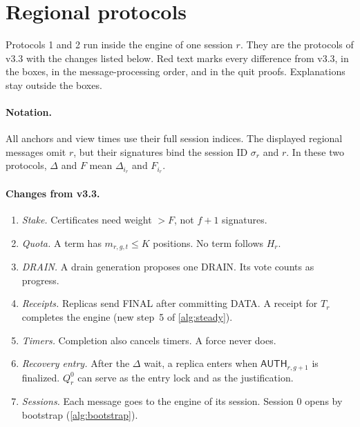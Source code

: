 \documentclass[11pt,a4paper]{article}
\newcommand{\RR}[1]{{\color{rrRed}#1}}
\newif\ifrevmarks
\newcommand{\Rv}[1]{\ifrevmarks\leavevmode{\color{rvBlue}#1}\else#1\fi}
\newcommand{\tagg}[1]{\ensuremath{\mathsf{#1}}}
\newcounter{protocol}
\begin{document}
\section{Regional protocols}
\label{sec:protocols}
Protocols 1 and 2 run inside the engine of one session $r$. They are the
protocols of v3.3 with the changes listed below. \RR{Red text} marks
every difference from v3.3, in the boxes, in the message-processing
order, and in the quit proofs. Explanations stay outside the boxes.

\paragraph{Notation.}
All anchors and view times use their full session indices. The displayed
regional messages omit $r$, but their signatures bind the \Rv{session ID
$\sigma_r$} and $r$. In these two protocols, $\Delta$ and $F$ mean
$\Delta_{i_r}$ and $F_{i_r}$.

\paragraph{Changes from v3.3.}
\begin{enumerate}[label=\arabic*.]
\item \emph{Stake.} Certificates need weight $>F$, not $f+1$ signatures.
\item \emph{Quota.} A term has $m_{r,g,t}\le K$ positions. No term follows
$H_r$.
\item \emph{DRAIN.} A drain generation proposes one DRAIN. Its vote
counts as progress.
\item \emph{Receipts.} Replicas send FINAL after committing DATA. A
receipt for $T_r$ completes the engine (new step~5 of \cref{alg:steady}).
\item \emph{Timers.} Completion also cancels timers. A force never does.
\item \emph{Recovery entry.} After the $\Delta$ wait, a replica enters
when $\tagg{AUTH}_{r,g+1}$ is finalized. $Q_r^0$ can serve as the entry
lock and as the justification.
\item \emph{Sessions.} Each message goes to the engine of its session.
Session $0$ opens by bootstrap (\cref{alg:bootstrap}).
\end{enumerate}
\end{document}
